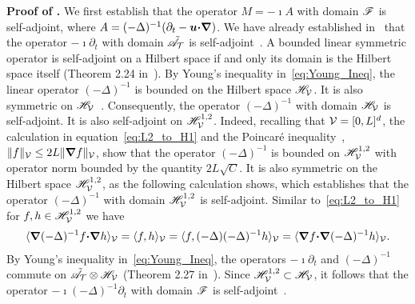 \documentclass[amsa]{ipart}
\begin{document}
\textbf{Proof of .}\hspace{1ex}
%
We first establish that the operator $M=-\imath A$ with domain
$\mathscr{F}$ is
self-adjoint, where $A=(-\Delta)^{-1}(\partial_t-\boldsymbol{u}\mbox{\boldmath${\cdot}$}\mbox{\boldmath${\nabla}$})$. We have
already established 
in~ that the operator $-\imath\partial_t$ with domain
$\tilde{\mathscr{A}}_{\mathcal{T}}$ is self-adjoint~\cite{Stone:64}. A bounded
linear symmetric operator is self-adjoint on a Hilbert space if and
only its domain is the Hilbert space itself (Theorem 2.24
in~\cite{Stone:64}). By Young's inequality in~\eqref{eq:Young_Ineq},
the linear operator $(-\Delta)^{-1}$ is bounded on the Hilbert space
$\mathscr{H}_{\mathcal{V}}$. It is also symmetric on
$\mathscr{H}_{\mathcal{V}}$~\cite{Stakgold:BVP:2000,Folland:95:PDEs}. Consequently,
the operator $(-\Delta)^{-1}$ with domain $\mathscr{H}_{\mathcal{V}}$ is
self-adjoint. It is also self-adjoint on $\mathscr{H}^{1,2}_{\mathcal{V}}$. Indeed,
recalling that $\mathcal{V}=[0,L]^d$, the calculation in
equation~\eqref{eq:L2_to_H1} and the Poincar{\'e} 
inequality~\cite{McOwen:2003:PDE}, $\|f\|_{\mathcal{V}}\leq2L\|\mbox{\boldmath${\nabla}$} f\|_{\mathcal{V}}$, show that the
operator $(-\Delta)^{-1}$ is bounded on $\mathscr{H}^{1,2}_{\mathcal{V}}$ with operator norm
bounded by the quantity $2L\sqrt{C}$. It is also
symmetric on the Hilbert space $\mathscr{H}^{1,2}_{\mathcal{V}}$, as the following
calculation shows, which establishes that the operator $(-\Delta)^{-1}$
with domain $\mathscr{H}^{1,2}_{\mathcal{V}}$ is self-adjoint. Similar
to~\eqref{eq:L2_to_H1} for $f,h\in\mathscr{H}^{1,2}_{\mathcal{V}}$ we have
% 
\begin{align}
  \langle\bnabla(-\Delta)^{-1}f\bcdot\bnabla h\rangle_{\Vc}
               =\langle f,h\rangle_{\Vc}
               =\langle f,(-\Delta)(-\Delta)^{-1}h\rangle_{\Vc}
               =\langle\bnabla f\bcdot\bnabla(-\Delta)^{-1}h\rangle_{\Vc}.
\end{align}
%
By Young's inequality
in~\eqref{eq:Young_Ineq}, the operators $-\imath\partial_t$ and $(-\Delta)^{-1}$
commute on
$\tilde{\mathscr{A}}_{\mathcal{T}}\otimes\mathscr{H}_{\mathcal{V}}$ (Theorem 2.27
in~\cite{Folland:99:RealAnalysis}). Since $\mathscr{H}^{1,2}_{\mathcal{V}}\subset\mathscr{H}_{\mathcal{V}}$, it 
follows that the operator $-\imath(-\Delta)^{-1}\partial_t$ with domain 
$\mathscr{F}$ is self-adjoint~\cite{Stone:64}. 
\end{document}
